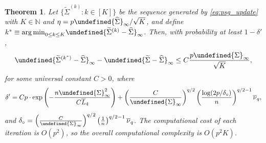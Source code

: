 \documentclass[10pt,a4paper]{amsart}
\theoremstyle{plain}
\newtheorem{theorem}{Theorem}[section]
\theoremstyle{remark}
\newcommand{\nats}{\ensuremath{\mathbb{N}}}
\def\hat#1{\widehat{#1}}
\def\tilde#1{\widetilde{#1}}
\def\bar#1{\overline{#1}}
\let\norm\undefined %
\DeclarePairedDelimiter\norm{\lVert}{\rVert}
\begin{document}
\setcounter{theorem}{2}
\begin{theorem} \label{thm:psg_error}
    Let $\{\tilde\Sigma^{(k)} : k \in [K]\}$ be the sequence generated by \cref{eq:psg_update} with $K \in \nats$ and $\eta = p \norm{\hat\Sigma}_\infty/\sqrt{K}$, and define $k^* \equiv {\arg\min}_{0 \leq k \leq K} \norm{\tilde\Sigma^{(k)}-\hat\Sigma}_\infty$.
    Then, with probability at least $1 - \delta'$,
    \begin{equation*}
        \norm{\tilde\Sigma^{(k^*)} - \hat\Sigma}_\infty - \norm{\tilde\Sigma - \hat\Sigma}_\infty 
        \leq C \frac{p \norm{\Sigma}_\infty}{\sqrt{K}},
    \end{equation*}
    for some universal constant $C>0$, where
    \begin{equation*}
        \delta' = C p \cdot \exp\left( - \frac{n \norm{\Sigma}_\infty^2}{C \bar{L}_4} \right) 
        + \left( \frac{C}{\norm{\Sigma}_\infty} \right)^{q/2} \left( \frac{\log(2p/\delta_\circ)}{n} \right)^{q/2 - 1} \bar\nu_q,
    \end{equation*}
    and $\delta_\circ = \left( \frac{C}{\norm{\Sigma}_\infty} \right)^{q/2} \left( \frac{1}{n} \right)^{q/2 - 1} \bar\nu_q$.
    The computational cost of each iteration is $O(p^{2})$, so the overall computational complexity is $O(p^{2} K)$.
\end{theorem}
\end{document}
